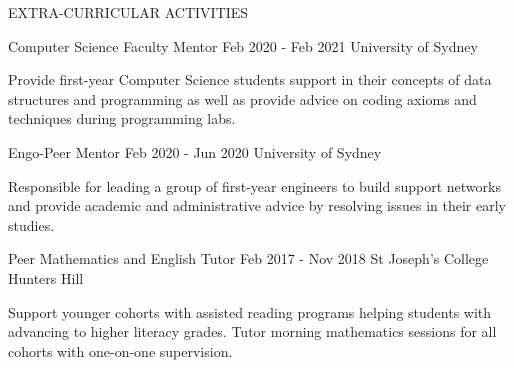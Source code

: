 
\begin{ResumeSection}{EXTRA-CURRICULAR ACTIVITIES} 

    
    \begin{DatedField}
        {Computer Science Faculty Mentor}
        {Feb 2020 - Feb 2021}
        {University of Sydney}
        {}
        \item Provide first-year Computer Science students support in their concepts of data structures and programming as well as provide advice on coding axioms and techniques during programming labs.
    \end{DatedField}

    \vspace{-0.75em}
    
    \begin{DatedField}
        {Engo-Peer Mentor}
        {Feb 2020 - Jun 2020}
        {University of Sydney}
        {}
        \item Responsible for leading a group of first-year engineers to build support networks and provide academic and administrative advice by resolving issues in their early studies.
    \end{DatedField}

    \vspace{-0.75em}
    
    \begin{DatedField}
        {Peer Mathematics and English Tutor}
        {Feb 2017 - Nov 2018}
        {St Joseph's College Hunters Hill}
        {}
        \item Support younger cohorts with assisted reading programs helping students with advancing to higher literacy grades. Tutor morning mathematics sessions for all cohorts with one-on-one supervision.
    \end{DatedField}
    
    
\end{ResumeSection}